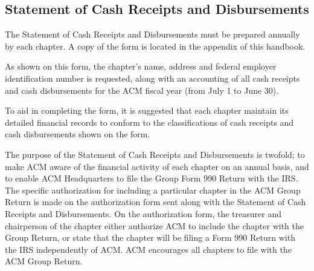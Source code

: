 \subsection{Statement of Cash Receipts and Disbursements}
The Statement of Cash Receipts and Disbursements must be prepared annually by
each chapter. A copy of the form is located in the appendix of this handbook.

As shown on this form, the chapter's name, address and federal employer
identification number is requested, along with an accounting of all cash
receipts and cash disbursements for the ACM fiscal year (from July 1 to June 30).

To aid in completing the form, it is suggested that each chapter maintain its
detailed financial records to conform to the classifications of cash receipts
and cash disbursements shown on the form.

The purpose of the Statement of Cash Receipts and Disbursements is twofold; to
make ACM aware of the financial activity of each chapter on an annual basis, and
to enable ACM Headquarters to file the Group Form 990 Return with the IRS. The
specific authorization for including a particular chapter in the ACM Group
Return is made on the authorization form sent along with the Statement of Cash
Receipts and Disbursements. On the authorization form, the treasurer and
chairperson of the chapter either authorize ACM to include the chapter with the
Group Return, or state that the chapter will be filing a Form 990 Return with
the IRS independently of ACM. ACM encourages all chapters to file with the ACM
Group Return.

